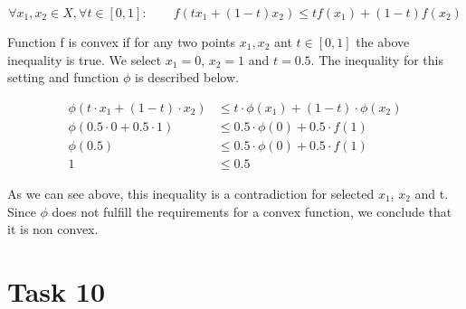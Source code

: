 \documentclass[12pt]{article}
\begin{document}
\begin{equation}
	\forall x_1, x_2 \in X, \forall t \in [0, 1]: \qquad f(tx_1+(1-t)x_2)\leq t f(x_1)+(1-t)f(x_2)
\end{equation}

Function f is convex if for any two points $x_{1}, x_{2}$ ant $t\in[0, 1]$ the above inequality is true. We select $x_{1} = 0$, $x_{2} = 1$ and $t=0.5$. The inequality for this setting and function $\phi$ is described below.

\begin{equation}
\begin{split}
	\phi(t \cdot x_1+(1-t) \cdot x_2) &\leq t \cdot \phi(x_1)+(1-t) \cdot \phi(x_2)\\
	\phi(0.5 \cdot 0 + 0.5 \cdot 1) &\leq 0.5 \cdot \phi(0) + 0.5 \cdot f(1)\\
	\phi(0.5) &\leq 0.5 \cdot \phi(0) + 0.5 \cdot f(1)\\
	1 &\leq 0.5
\end{split}
\end{equation}

As we can see above, this inequality is a contradiction for selected $x_{1}$, $x_{2}$ and t. Since $\phi$ does not fulfill the requirements for a convex function, we conclude that it is non convex.


\section {Task 10}
\noindent{} \\
\end{document}
